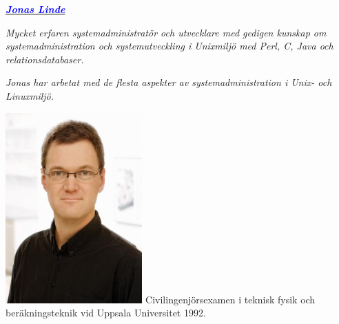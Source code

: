 \documentclass[11pt,a4paper,oneside]{article}
\begin{document}
%
\chead{}
%
\cfoot{{\fontsize{8pt}{9pt}\selectfont}}
%
\begin{minipage}[t]{10cm}
  \parskip 6pt
  {\fontsize{16pt}{24pt}\selectfont\textbf{\emph{\uline{\textcolor{blue}{Jonas Linde}}}}}

  \emph{Mycket erfaren systemadministratör och utvecklare med gedigen
    kunskap om systemadministration och systemutveckling i Unixmiljö
    med Perl, C, Java och relationsdatabaser.}

  \emph{Jonas har arbetat med de flesta aspekter av systemadministration i Unix- och Linuxmiljö.}
\end{minipage}
\hspace{0.5cm}
\begin{minipage}[t]{5.25cm}
  \includegraphics[valign=t,width=5.25cm]{jonas_linde.jpg}
   Civilingenjörsexamen i
   teknisk fysik och beräkningsteknik vid
   Uppsala Universitet 1992.
\end{minipage}
\end{document}
